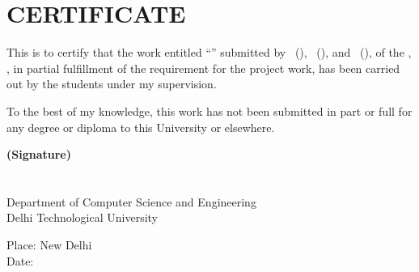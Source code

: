 \chapter*{CERTIFICATE}


This is to certify that the work entitled ``\projecttitle'' submitted by \studentone\ (\studentoneroll), \studenttwo\ (\studenttworoll), and \studentthree\ (\studentthreeroll), of the \department, \university, in partial fulfillment of the requirement for the project work, has been carried out by the students under my supervision.

To the best of my knowledge, this work has not been submitted in part or full for any degree or diploma to this University or elsewhere.

\vspace{2cm}

\begin{flushright}
\textbf{(Signature)}\\
\projectguide\\
\supervisordesignation\\
Department of Computer Science and Engineering\\
Delhi Technological University
\end{flushright}

\vspace{1cm}

Place: New Delhi\\
Date: \reportmonth

\clearpage
